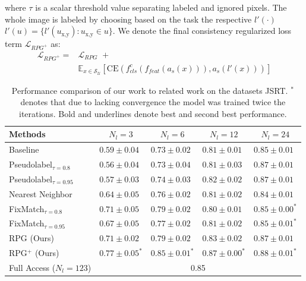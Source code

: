 \documentclass[letterpaper]{article} %
\begin{document}
where $\tau$ is a scalar threshold value separating labeled and ignored pixels.
The whole image is labeled by choosing based on the task the respective $l'(\cdot)$ 
$l'(u) = \{l'(u_{\text{x},\text{y}}) : u_{\text{x},\text{y}} \in u\}$.
We denote the final consistency regularized loss term $\mathcal{L}_{{RPG}^+}$ as:
\begin{equation}
\begin{aligned}
    \mathcal{L}_{{RPG}^+} = & \mathcal{L}_{RPG} \,\,+\\&
    \mathbb{E}_{x\in \mathcal{S}_\mathcal{U}}
    [\mathrm{CE}(f_{cls}^c(f_{feat}(\mathit{a}_s(x))),\mathit{a}_s(l'(x))) ]
\end{aligned}
\end{equation}


\begin{table}[bp]
  \centering
  \begin{tabular}{lllll}
  \toprule
  Methods&\multicolumn{1}{c}{$N_l=3$}&\multicolumn{1}{c}{$N_l=6$}&\multicolumn{1}{c}{$N_l=12$}&\multicolumn{1}{c}{$N_l=24$}\\
    \midrule
    Baseline &$0.59\pm0.04$&$0.73\pm0.02$&$0.81\pm0.01$&$0.85\pm0.01$\\
    Pseudolabel$_{\tau = 0.8}$~\cite{lee2013pseudo}  &$0.56\pm0.04$&$0.73\pm0.04$&$0.81\pm0.03$&\underline{$0.87\pm0.01$}\\
    Pseudolabel$_{\tau = 0.95}$~\cite{lee2013pseudo} &$0.57\pm0.03$&$0.74\pm0.03$&$0.82\pm0.02$&\underline{$0.87\pm0.01$}\\
    Nearest Neighbor                        &$0.64\pm0.05$&$0.76\pm0.02$&$0.81\pm0.02$&$0.84\pm0.01$\\
    FixMatch$_{\tau = 0.8}$~\cite{sohn2020fixmatch}  &\underline{$0.71\pm0.05$}&\underline{$0.79\pm0.02$}&$0.80\pm0.01$&$0.85\pm0.00^*$\\
    FixMatch$_{\tau = 0.95}$~\cite{sohn2020fixmatch} &$0.67\pm0.05$&$0.77\pm0.02$&$0.81\pm0.02$&$0.85\pm0.01^*$\\
    RPG    (Ours)                                 &\underline{$0.71\pm0.02$}&\underline{$0.79\pm0.02$}&\underline{$0.83\pm0.02$}&\underline{$0.87\pm0.01$}\\
    RPG$^+$ (Ours)& $\mathbf{0.77\pm0.05^*}$&$\mathbf{0.85\pm0.01^*}$&$\mathbf{0.87\pm0.00^*}$& $\mathbf{0.88\pm0.01^*}$\\\midrule
    Full Access ($N_l=123$) &\multicolumn{4}{c}{0.85}\\\bottomrule
    
  \end{tabular}
  
  \caption{Performance comparison of our work to related work on the datasets JSRT. $^*$ denotes that due to lacking convergence the model was trained twice the iterations. Bold and underlines denote best and second best performance.}
  \label{table:jsrt_results}

\end{table}
\end{document}
